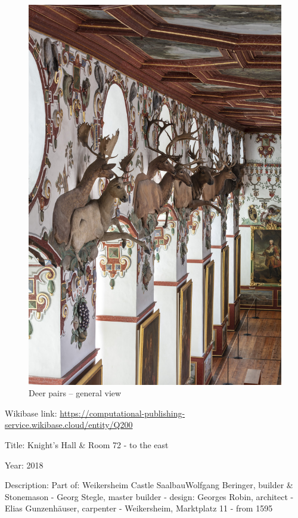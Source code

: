 \documentclass[
  letterpaper,
]{book}
\begin{document}
\begin{figure}[H]

{\centering \includegraphics{impressum_files/mediabag/fmd10005866a.jpg}

}

\caption{Deer pairs -- general view}

\end{figure}%

Wikibase link:
\url{https://computational-publishing-service.wikibase.cloud/entity/Q200}

Title: Knight's Hall \& Room 72 - to the east

Year: 2018

Description: Part of: Weikersheim Castle SaalbauWolfgang Beringer,
builder \& Stonemason - Georg Stegle, master builder - design: Georges
Robin, architect - Elias Gunzenhäuser, carpenter - Weikersheim,
Marktplatz 11 - from 1595
\end{document}
